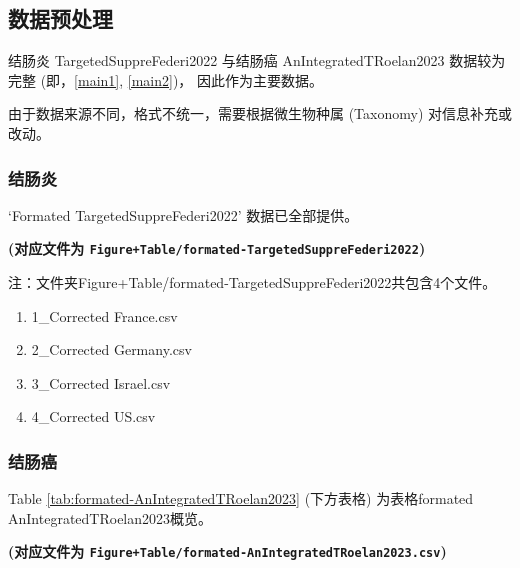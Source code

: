 \documentclass[
]{article}
\providecommand{\tightlist}{%
  \setlength{\itemsep}{0pt}\setlength{\parskip}{0pt}}
\begin{document}
\hypertarget{ux6570ux636eux9884ux5904ux7406}{%
\subsection{数据预处理}\label{ux6570ux636eux9884ux5904ux7406}}

结肠炎 TargetedSuppreFederi2022 与结肠癌 AnIntegratedTRoelan2023 数据较为完整 (即，\ref{main1}, \ref{main2})，
因此作为主要数据。

由于数据来源不同，格式不统一，需要根据微生物种属 (Taxonomy) 对信息补充或改动。

\hypertarget{ux7ed3ux80a0ux708e}{%
\subsubsection{结肠炎}\label{ux7ed3ux80a0ux708e}}

`Formated TargetedSuppreFederi2022' 数据已全部提供。

\textbf{(对应文件为 \texttt{Figure+Table/formated-TargetedSuppreFederi2022})}

\begin{center}\begin{tcolorbox}[colback=gray!10, colframe=gray!50, width=0.9\linewidth, arc=1mm, boxrule=0.5pt]注：文件夹Figure+Table/formated-TargetedSuppreFederi2022共包含4个文件。

\begin{enumerate}\tightlist
\item 1\_Corrected France.csv
\item 2\_Corrected Germany.csv
\item 3\_Corrected Israel.csv
\item 4\_Corrected US.csv
\end{enumerate}\end{tcolorbox}
\end{center}

\hypertarget{ux7ed3ux80a0ux764c}{%
\subsubsection{结肠癌}\label{ux7ed3ux80a0ux764c}}

Table \ref{tab:formated-AnIntegratedTRoelan2023} (下方表格) 为表格formated AnIntegratedTRoelan2023概览。

\textbf{(对应文件为 \texttt{Figure+Table/formated-AnIntegratedTRoelan2023.csv})}
\end{document}
